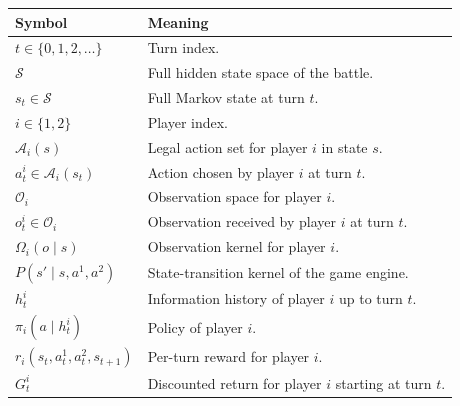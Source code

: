\documentclass[aps,pre,twocolumn,superscriptaddress,nofootinbib]{revtex4-2}
\newcommand{\cS}{\mathcal{S}}
\newcommand{\cA}{\mathcal{A}}
\newcommand{\cO}{\mathcal{O}}
\theoremstyle{definition}
\theoremstyle{plain}
\begin{document}
\begin{table}[t]
    \centering
    \begin{tabular}{p{} p{}}
        \toprule
        Symbol                               & Meaning                                                                      \\
        \midrule
        $t \in \{0,1,2,\dots\}$              & Turn index.                                                                  \\
        $\cS$                                & Full hidden state space of the battle.                                       \\
        $s_t \in \cS$                        & Full Markov state at turn $t$.                                               \\
        $i \in \{1,2\}$                      & Player index.                                                                \\
        $\cA_i(s)$                           & Legal action set for player $i$ in state $s$.                                \\
        $a_t^i \in \cA_i(s_t)$               & Action chosen by player $i$ at turn $t$.                                     \\
        $\cO_i$                              & Observation space for player $i$.                                            \\
        $o_t^i \in \cO_i$                    & Observation received by player $i$ at turn $t$.                              \\
        $\Omega_i(o\mid s)$                  & Observation kernel for player $i$.                                           \\
        $P(s'\mid s,a^1,a^2)$                & State-transition kernel of the game engine.                                  \\
        $h_t^i$                              & Information history of player $i$ up to turn $t$.                            \\
        $\pi_i(a\mid h_t^i)$                 & Policy of player $i$.                                                        \\
        $r_i(s_t,a_t^1,a_t^2,s_{t+1})$       & Per-turn reward for player $i$.                                              \\
        $G_t^i$                              & Discounted return for player $i$ starting at turn $t$.                       \\

\end{tabular}
\end{table}
\end{document}
